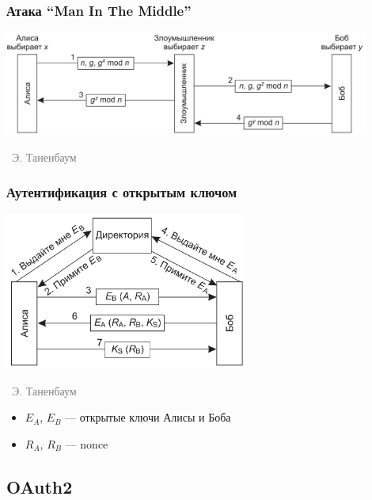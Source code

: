 \documentclass[xetex,mathserif,serif]{beamer}
\newcommand{\attribution}[1] {
\vspace{-5mm}\begin{flushright}\begin{scriptsize}\textcolor{gray}{\textcopyright\, #1}\end{scriptsize}\end{flushright}
}
\begin{document}
	\begin{frame}
		\frametitle{Атака ``Man In The Middle''}
		\begin{center}
			\includegraphics[width=0.9\textwidth]{diffieHellmanMitm.png}
			\attribution{Э. Таненбаум}
		\end{center}
	\end{frame}

	\begin{frame}
		\frametitle{Аутентификация с открытым ключом}
		\begin{center}
			\includegraphics[width=0.6\textwidth]{openKeyAuthentication.png}
			\attribution{Э. Таненбаум}
		\end{center}
		\begin{itemize}
			\item $E_A$, $E_B$ --- открытые ключи Алисы и Боба
			\item $R_A$, $R_B$ --- nonce
		\end{itemize}
	\end{frame}

	\subsection{OAuth2}
\end{document}
